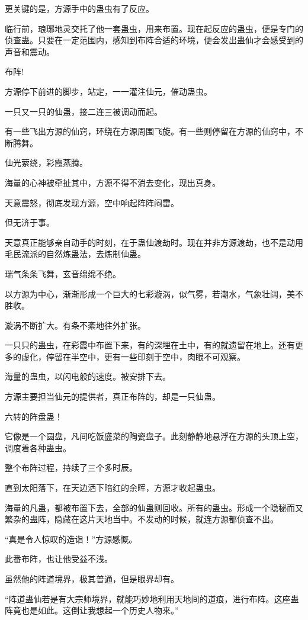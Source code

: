 \begin{this_body}
更关键的是，方源手中的蛊虫有了反应。

临行前，琅琊地灵交托了他一套蛊虫，用来布置。现在起反应的蛊虫，便是专门的侦查蛊。只要在一定范围内，感知到布阵合适的环境，便会发出蛊仙才会感受到的声音和震动。

布阵!

方源停下前进的脚步，站定，一一灌注仙元，催动蛊虫。

一只又一只的仙蛊，接二连三被调动而起。

有一些飞出方源的仙窍，环绕在方源周围飞旋。有一些则停留在方源的仙窍中，不断腾舞。

仙光萦绕，彩霞蒸腾。

海量的心神被牵扯其中，方源不得不消去变化，现出真身。

天意震怒，彻底发现方源，空中响起阵阵闷雷。

但无济于事。

天意真正能够亲自动手的时刻，在于蛊仙渡劫时。现在并非方源渡劫，也不是动用毛民流派的自然炼蛊法，去炼制仙蛊。

瑞气条条飞舞，玄音绵绵不绝。

以方源为中心，渐渐形成一个巨大的七彩漩涡，似气雾，若潮水，气象壮阔，美不胜收。

漩涡不断扩大。有条不紊地往外扩张。

一只只的蛊虫，在彩霞中布置下来，有的深埋在土中，有的就遗留在地上。还有更多的虚化，停留在半空中，更有一些印刻于空中，肉眼不可观察。

海量的蛊虫，以闪电般的速度。被安排下去。

方源主要担当仙元的提供者，真正布阵的，却是一只仙蛊。

六转的阵盘蛊！

它像是一个圆盘，凡间吃饭盛菜的陶瓷盘子。此刻静静地悬浮在方源的头顶上空，调度着各种蛊虫。

整个布阵过程，持续了三个多时辰。

直到太阳落下，在天边洒下暗红的余晖，方源才收起蛊虫。

海量的凡蛊，都被布置下去，全部的仙蛊则回收。所有的蛊虫。形成一个隐秘而又繁杂的蛊阵，隐藏在这片天地当中。不发动的时候，就连方源都侦查不出。

“真是令人惊叹的造诣！”方源感慨。

此番布阵，也让他受益不浅。

虽然他的阵道境界，极其普通，但是眼界却有。

“阵道蛊仙若是有大宗师境界，就能巧妙地利用天地间的道痕，进行布阵。这座蛊阵竟也是如此。这倒让我想起一个历史人物来。”


\end{this_body}
